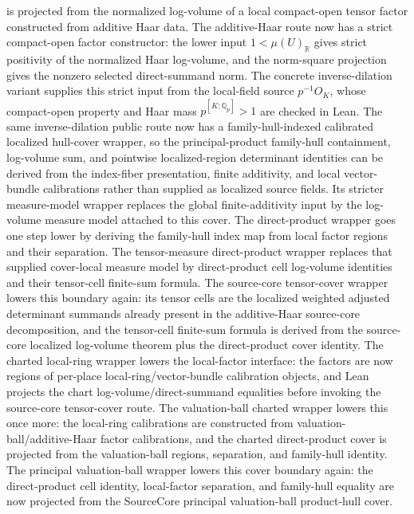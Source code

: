 \begin{proposition}
  is projected from the normalized log-volume of a local compact-open tensor
  factor constructed from additive Haar data.  The additive-Haar route now has
  a strict compact-open factor constructor: the lower input
  \(1 < \mu(U)_{\mathbb R}\) gives strict positivity of the normalized Haar
  log-volume, and the norm-square projection gives the nonzero selected
  direct-summand norm.  The concrete inverse-dilation variant supplies this
  strict input from the local-field source \(p^{-1}O_K\), whose compact-open
  property and Haar mass \(p^{[K:\mathbb Q_p]}>1\) are checked in Lean.  The
  same inverse-dilation public route now has a family-hull-indexed calibrated
  localized hull-cover wrapper, so the principal-product family-hull
  containment, log-volume sum, and pointwise localized-region determinant
  identities can be derived from the index-fiber presentation, finite
  additivity, and local vector-bundle calibrations rather than supplied as
  localized source fields.  Its stricter measure-model wrapper replaces the
  global finite-additivity input by the log-volume measure model attached to
  this cover.  The direct-product wrapper goes one step lower by deriving the
  family-hull index map from local factor regions and their separation.  The
  tensor-measure direct-product wrapper replaces that supplied cover-local
  measure model by direct-product cell log-volume identities and their
  tensor-cell finite-sum formula.  The source-core tensor-cover wrapper lowers
  this boundary again: its tensor cells are the localized weighted adjusted
  determinant summands already present in the additive-Haar source-core
  decomposition, and the tensor-cell finite-sum formula is derived from the
  source-core localized log-volume theorem plus the direct-product cover
  identity.  The charted local-ring wrapper lowers the local-factor interface:
  the factors are now regions of per-place local-ring/vector-bundle
  calibration objects, and Lean projects the chart log-volume/direct-summand
  equalities before invoking the source-core tensor-cover route.  The
  valuation-ball charted wrapper lowers this once more: the local-ring
  calibrations are constructed from valuation-ball/additive-Haar factor
  calibrations, and the charted direct-product cover is projected from the
  valuation-ball regions, separation, and family-hull identity.  The principal
  valuation-ball wrapper lowers this cover boundary again: the direct-product
  cell identity, local-factor separation, and family-hull equality are now
  projected from the SourceCore principal valuation-ball product-hull cover.

\end{proposition}
